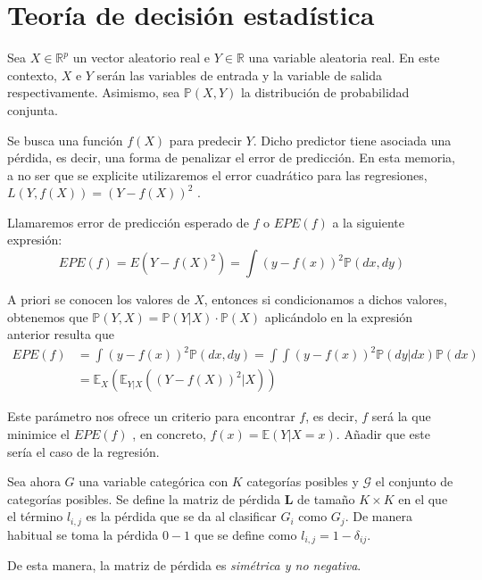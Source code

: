 \section{Teoría de decisión estadística}
Sea $X\in \mathbb{R}^p$ un vector aleatorio real e $Y \in \mathbb{R}$ una variable aleatoria real. En este contexto, $X$ e $Y$ serán las variables de entrada y la variable de salida respectivamente. Asimismo, sea $\mathbb{P}(X,Y)$ la distribución de probabilidad conjunta.   

Se busca una función $f(X)$ para predecir $Y$. Dicho predictor tiene asociada una pérdida, es decir, una forma de penalizar el error de predicción. En esta memoria, a no ser que se explicite utilizaremos el error cuadrático para las regresiones, $L(Y,f(X))=(Y-f(X))^2$ . 

\begin{defi}
Llamaremos error de predicción esperado de $f$ o $EPE(f)$ a la siguiente expresión:
\begin{equation}
EPE(f)=E(Y-f(X)^2)=\int (y-f(x))^2 \mathbb{P}(dx,dy)
\end{equation}

\noindent A priori se conocen los valores de $X$, entonces si condicionamos a dichos valores, obtenemos que $\mathbb{P}(Y,X)=\mathbb{P}(Y|X)\cdot\mathbb{P}(X)$ aplicándolo en la expresión anterior resulta que 
\begin{equation}
\begin{split}
EPE(f)&=\int (y-f(x))^2 \mathbb{P}(dx,dy)=\int\int (y-f(x))^2 \mathbb{P}(dy|dx)\mathbb{P}(dx)\\
&= \mathbb{E}_X(\mathbb{E}_{Y|X}((Y-f(X))^2|X))
\end{split}
\end{equation}

\end{defi}

\noindent Este parámetro nos ofrece un criterio para encontrar $f$, es decir, $f$ será la que minimice el $EPE(f)$ , en concreto, $f(x)=\mathbb{E}(Y|X=x)$. Añadir que este sería el caso de la regresión. 

\noindent Sea ahora $G$ una variable categórica con $K$ categorías posibles y $\mathcal{G}$ el conjunto de categorías posibles. Se define la matriz de pérdida \textbf{L} de tamaño $K\times K$ en el que el término $l_{i,j}$ es la pérdida que se da al clasificar $G_i$ como $G_j$. De manera habitual se toma la pérdida $0-1$ que se define como $l_{i,j}=1-\delta_{ij}$. 

\noindent De esta manera, la matriz de pérdida es \textit{simétrica y no negativa}. 
 

